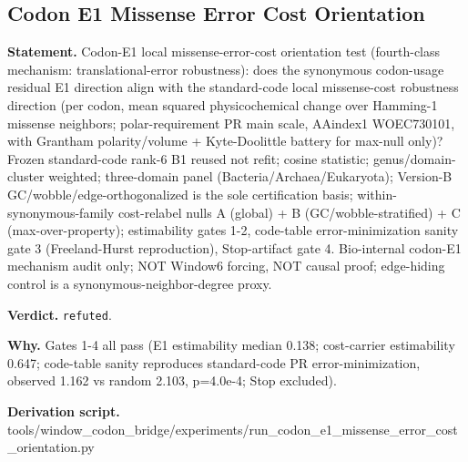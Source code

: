 \subsection{Codon E1 Missense Error Cost Orientation}\label{sec:bridge-codon-e1-missense-error-cost-orientation}
\textbf{Statement.} Codon-E1 local missense-error-cost orientation test (fourth-class mechanism: translational-error
robustness): does the synonymous codon-usage residual E1 direction align with the standard-code
local missense-cost robustness direction (per codon, mean squared physicochemical change over
Hamming-1 missense neighbors; polar-requirement PR main scale, AAindex1 WOEC730101, with Grantham
polarity/volume + Kyte-Doolittle battery for max-null only)? Frozen standard-code rank-6 B1 reused
not refit; cosine statistic; genus/domain-cluster weighted; three-domain panel
(Bacteria/Archaea/Eukaryota); Version-B GC/wobble/edge-orthogonalized is the sole certification
basis; within-synonymous-family cost-relabel nulls A (global) + B (GC/wobble-stratified) + C
(max-over-property); estimability gates 1-2, code-table error-minimization sanity gate 3
(Freeland-Hurst reproduction), Stop-artifact gate 4. Bio-internal codon-E1 mechanism audit only; NOT
Window6 forcing, NOT causal proof; edge-hiding control is a synonymous-neighbor-degree proxy.

\textbf{Verdict.} \texttt{refuted}.

\textbf{Why.} Gates 1-4 all pass (E1 estimability median 0.138; cost-carrier estimability 0.647; code-table sanity
reproduces standard-code PR error-minimization, observed 1.162 vs random 2.103, p=4.0e-4; Stop
excluded).

\textbf{Derivation script.} tools/window\_codon\_bridge/experiments/run\_codon\_e1\_missense\_error\_cost\_orientation.py

